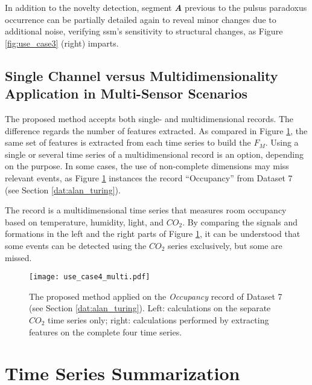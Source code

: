 In addition to the novelty detection, segment \textbf{\textit{A}} previous to the pulsus paradoxus occurrence can be partially detailed again to reveal minor changes due to additional noise, verifying \gls{ssm}'s sensitivity to structural changes, as Figure \ref{fig:use_case3} (right) imparts.

\subsection{Single Channel versus Multidimensionality Application in Multi-Sensor Scenarios}
\label{sec:multi_example}

The proposed method accepts both single- and multidimensional records. The difference regards the number of features extracted. As compared in Figure \ref{fig:use_case4}, the same set of features is extracted from each time series to build the $F_M$.
Using a single or several time series of a multidimensional record is an option, depending on the purpose. In some cases, the use of non-complete dimensions may miss relevant events, as Figure \ref{fig:use_case4} instances the record ``Occupancy'' from Dataset 7 (see Section \ref{dat:alan_turing}). 

The record is a multidimensional time series that measures room occupancy based on temperature, humidity, light, and $CO_2$. By comparing the signals and formations in the left and the right parts of Figure \ref{fig:use_case4}, it can be understood that some events can be detected using the $CO_2$ series exclusively, but some are missed.

\begin{figure}[H]
    \centering
    \texttt{[image: use\_case4\_multi.pdf]}
    \caption{The proposed method applied on the \textit{Occupancy} record of Dataset 7 (see Section \ref{dat:alan_turing}). Left: calculations on the separate $CO_2$ time series only; right: calculations performed by extracting features on the complete four time series.}
    \label{fig:use_case4}
\end{figure}

\section{Time Series Summarization}

